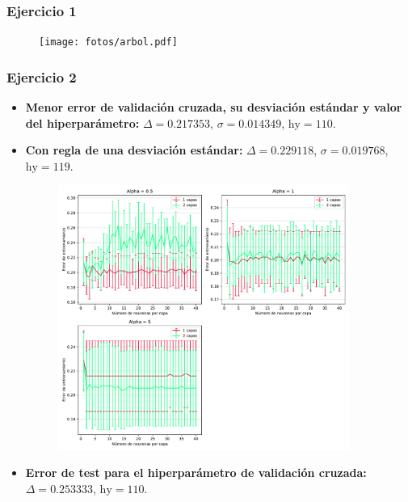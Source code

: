 \documentclass[11pt]{article}
\begin{document}
\subsubsection*{Ejercicio 1}

\begin{figure}[H]
\centering
\texttt{[image: fotos/arbol.pdf]}
\end{figure}

\subsubsection*{Ejercicio 2}

\begin{itemize}
    \item \textbf{Menor error de validación cruzada, su desviación estándar y valor del hiperparámetro:} $\Delta = 0.217353$, $\sigma = 0.014349$, $\text{hy} = 110$.
    \item \textbf{Con regla de una desviación estándar:} $\Delta = 0.229118$, $\sigma = 0.019768$, $\text{hy} = 119$.
    \begin{figure}[H]
    \centering
    \includegraphics[width=0.9\textwidth]{fotos/ej2_1.pdf}
    \end{figure}
    \item \textbf{Error de test para el hiperparámetro de validación cruzada:} $\Delta = 0.253333$, $\text{hy} = 110$.
    \begin{figure}[H]
    \centering

\end{figure}
\end{itemize}
\end{document}
